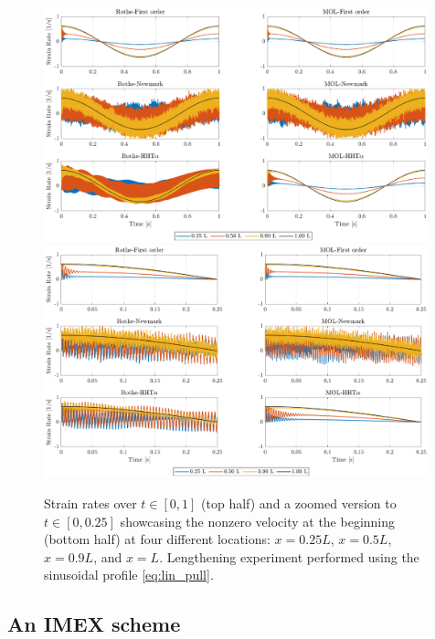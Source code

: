 \documentclass{sfuthesis}
\numberwithin{equation}{section}
\numberwithin{figure}{chapter}
\numberwithin{table}{chapter}
\theoremstyle{definition}
\begin{document}
\begin{figure}
    \centering
    \includegraphics[width=0.99\textwidth]{nh_sin_vel_1.eps}
    \includegraphics[width=0.99\textwidth]{nh_sin_vel_2.eps}
    \caption{Strain rates over $t \in [0,1]$ (top half) and a zoomed version to $t \in [0,0.25]$ showcasing the nonzero velocity at the beginning (bottom half) at four different locations: $x = 0.25L$, $x=0.5L$, $x=0.9L$, and $x=L$. Lengthening experiment performed using the sinusoidal profile \eqref{eq:lin_pull}.
    \label{fig:sin_pull_vel}}
\end{figure}


\subsection*{An IMEX scheme}
\end{document}
